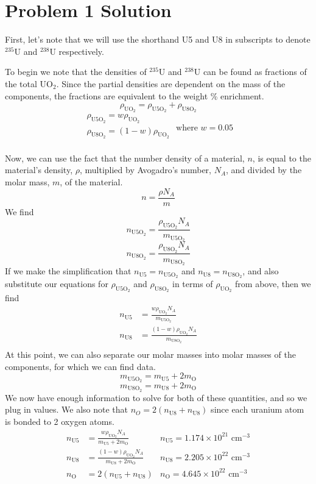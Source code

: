 \section*{Problem 1 Solution}

First, let's note that we will use the shorthand U5 and U8 in subscripts to denote $^{235}$U and $^{238}$U respectively. 

To begin we note that the densities of $^{235}$U and $^{238}$U can be found as fractions of the total UO$_2$. Since the partial densities are dependent on the mass of the components, the fractions are equivalent to the weight \% enrichment.
$$ \rho_{\text{UO}_2} = \rho_{\text{U5O}_2} + \rho_{\text{U8O}_2}$$
$$ \begin{array}{lr}
        \rho_{\text{U5O}_2} = w\rho_{\text{UO}_2}    \\
        \rho_{\text{U8O}_2} = (1-w)\rho_{\text{UO}_2}\\
        \end{array} \text{ where } w = 0.05 $$
        
Now, we can use the fact that the number density of a material, $n$, is equal to the material's density, $\rho$, multiplied by Avogadro's number, $N_A$, and divided by the molar mass, $m$, of the material. 
$$ n = \frac{\rho N_A}{m} $$
We find
$$ n_{\text{U5O}_2} = \frac{\rho_{\text{U5O}_2} N_A}{m_{\text{U5O}_2}} $$
$$ n_{\text{U8O}_2} = \frac{\rho_{\text{U8O}_2} N_A}{m_{\text{U8O}_2}} $$
If we make the simplification that $n_{\text{U5}} = n_{\text{U5O}_2}$ and $n_{\text{U8}} = n_{\text{U8O}_2}$, and also substitute our equations for $\rho_{\text{U5O}_2}$ and $\rho_{\text{U8O}_2}$ in terms of $\rho_{\text{UO}_2}$ from above, then we find 
\begin{align*}
n_{\text{U5}} &= \frac{w\rho_{\text{UO}_2} N_A}{m_{\text{U5O}_2}} \\
n_{\text{U8}} &= \frac{(1-w)\rho_{\text{UO}_2} N_A}{m_{\text{U8O}_2}} \\
\end{align*}
At this point, we can also separate our molar masses into molar masses of the components, for which we can find data. 
$$ m_{\text{U5O}_2} = m_{\text{U5}} + 2m_{\text{O}} $$
$$ m_{\text{U8O}_2} = m_{\text{U8}} + 2m_{\text{O}} $$
We now have enough information to solve for both of these quantities, and so we plug in values. We also note that $n_O = 2(n_{\text{U8}} + n_{\text{U8}})$ since each uranium atom is bonded to 2 oxygen atoms.
\begin{align*}
n_{\text{U5}}	&= \frac{w\rho_{\text{UO}_2} N_A}{m_{\text{U5}} + 2m_{\text{O}}}		& \boxed{n_{\text{U5}}= 1.174 \times 10^{21} \text{ cm}^{-3} }\\
n_{\text{U8}}	&= \frac{(1-w)\rho_{\text{UO}_2} N_A}{m_{\text{U8}} + 2m_{\text{O}}} 	& \boxed{n_{\text{U8}}= 2.205 \times 10^{22} \text{ cm}^{-3} }\\
n_{\text{O}}	&= 2(n_{\text{U5}} + n_{\text{U8}})  									& \boxed{n_{\text{O}}= 4.645 \times 10^{22} \text{ cm}^{-3} }\\
\end{align*}

